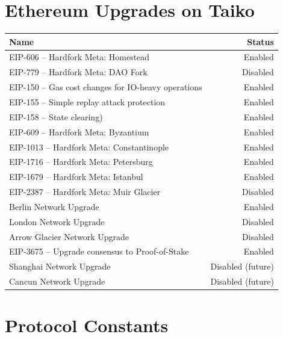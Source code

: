 \documentclass[9pt,oneside]{amsart}
\begin{document}
\section{Ethereum Upgrades on Taiko}\label{sec:eips}

\begin{tabu}{l r }
\toprule
Name & Status \\
\midrule
EIP-606 -- Hardfork Meta: Homestead & \quad \quad \quad \quad \quad \quad \quad \quad \quad \quad \quad \quad \quad \quad \quad \quad \quad \quad \quad \quad \quad \quad  Enabled \\
EIP-779 -- Hardfork Meta: DAO Fork & Disabled \\
EIP-150 -- Gas cost changes for IO-heavy operations & Enabled \\
EIP-155 -- Simple replay attack protection &  Enabled \\
EIP-158 -- State clearing) & Enabled \\
EIP-609 -- Hardfork Meta: Byzantium & Enabled \\
EIP-1013 -- Hardfork Meta: Constantinople & Enabled \\
EIP-1716 -- Hardfork Meta: Petersburg & Enabled \\
EIP-1679 -- Hardfork Meta: Istanbul & Enabled \\
EIP-2387 -- Hardfork Meta: Muir Glacier & Disabled \\
Berlin Network Upgrade & Enabled \\
London Network Upgrade & Disabled \\
Arrow Glacier Network Upgrade & Disabled \\
EIP-3675 -- Upgrade consensus to Proof-of-Stake & Enabled \\
Shanghai Network Upgrade & Disabled (future) \\
Cancun Network Upgrade & Disabled (future)  \\
\bottomrule
\end{tabu}



\section{Protocol Constants}\label{sec:constants1}
\end{document}
